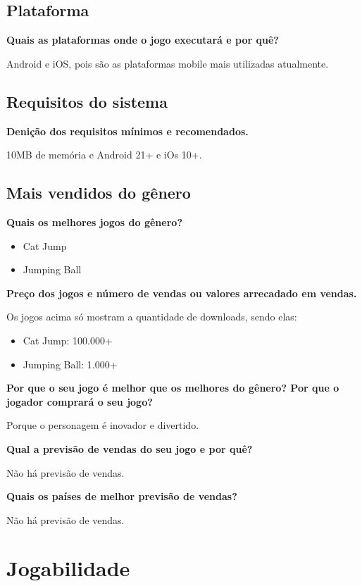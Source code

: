 \documentclass[]{scrartcl}
\begin{document}
\subsection{Plataforma}

\noindent\textbf{Quais as plataformas onde o jogo executará e por quê?}

Android e iOS, pois são as plataformas mobile mais utilizadas atualmente.


\subsection{Requisitos do sistema}

\noindent\textbf{Denição dos requisitos mínimos e recomendados.}

10MB de memória e Android 21+ e iOs 10+.

\subsection{Mais vendidos do gênero}

\noindent\textbf{Quais os melhores jogos do gênero?}

\begin{itemize}
    \item Cat Jump
    \item Jumping Ball
\end{itemize}

\noindent\textbf{Preço dos jogos e número de vendas ou valores arrecadado em vendas.}

Os jogos acima só mostram a quantidade de downloads, sendo elas:

\begin{itemize}
    \item Cat Jump: 100.000+
    \item Jumping Ball: 1.000+
\end{itemize}

\noindent\textbf{Por que o seu jogo é melhor que os melhores do gênero? Por que o jogador comprará o seu jogo?}

Porque o personagem é inovador e divertido.

\noindent\textbf{Qual a previsão de vendas do seu jogo e por quê?}

Não há previsão de vendas.

\noindent\textbf{Quais os países de melhor previsão de vendas?}

Não há previsão de vendas.

\section{Jogabilidade}
\end{document}
